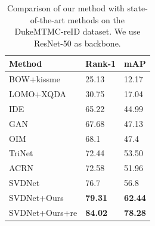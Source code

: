 \documentclass[10pt,twocolumn,letterpaper]{article}
\begin{document}
\begin{table}
\small
\begin{center}
%
%
\begin{tabularx}{\linewidth}{ l|C|C }
\hline
Method & Rank-1 & mAP \\
\hline
\hline
{BOW}+kissme  \cite{zheng2015scalable}  & 25.13 & 12.17 \\
LOMO+XQDA \cite{liao2015lomo} & 30.75 & 17.04  \\ 
IDE \cite{reid-survey} & 65.22 & 44.99 \\
{GAN} \cite{zheng2017unlabeled} & 67.68 & 47.13 \\
OIM \cite{xiao2017oim} & 68.1 & 47.4 \\
TriNet \cite{hermans2017defense} & 72.44 & 53.50 \\ 	%
ACRN \cite{schumann2017person} & 72.58 & 51.96\\
SVDNet \cite{sun2017svdnet} & 76.7 & 56.8 \\
\hline 
\hline
SVDNet+Ours & \textbf{79.31} & \textbf{62.44} \\
SVDNet+Ours+re \cite{zhong2017re}& \textbf{84.02}& \textbf{78.28} \\
\hline
\end{tabularx}
\end{center}
\vspace{-.1in}
\caption{\label{tabel:duke-state} Comparison of our method with state-of-the-art methods on the DukeMTMC-reID dataset. We use ResNet-50 as backbone.}
\end{table}


\end{document}
